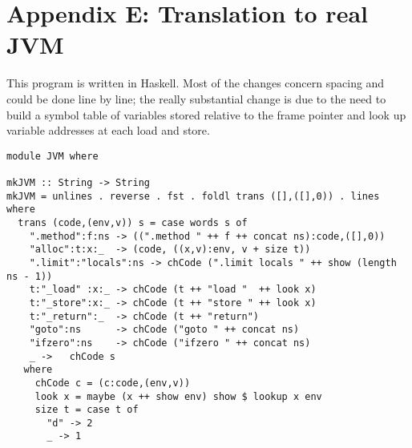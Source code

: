 \documentclass[12pt]{article}
\begin{document}
\section*{Appendix E: Translation to real JVM}

This program is written in Haskell. Most of the changes concern
spacing and could be done line by line; the really substantial
change is due to the need to build a symbol table of variables
stored relative to the frame pointer and look up variable
addresses at each load and store.
\small
\begin{verbatim}
module JVM where

mkJVM :: String -> String
mkJVM = unlines . reverse . fst . foldl trans ([],([],0)) . lines where
  trans (code,(env,v)) s = case words s of
    ".method":f:ns -> ((".method " ++ f ++ concat ns):code,([],0))
    "alloc":t:x:_  -> (code, ((x,v):env, v + size t))
    ".limit":"locals":ns -> chCode (".limit locals " ++ show (length ns - 1))
    t:"_load" :x:_ -> chCode (t ++ "load "  ++ look x) 
    t:"_store":x:_ -> chCode (t ++ "store " ++ look x)
    t:"_return":_  -> chCode (t ++ "return")
    "goto":ns      -> chCode ("goto " ++ concat ns)
    "ifzero":ns    -> chCode ("ifzero " ++ concat ns) 
    _ ->   chCode s
   where
     chCode c = (c:code,(env,v))
     look x = maybe (x ++ show env) show $ lookup x env
     size t = case t of
       "d" -> 2
       _ -> 1
\end{verbatim}
\normalsize
\newpage
\end{document}
